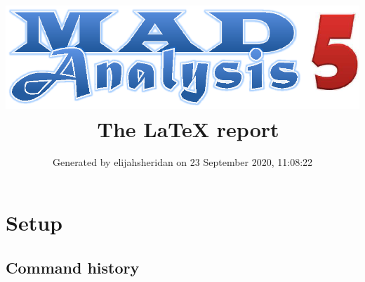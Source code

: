 \documentclass[a4paper, 10pt]{article}
\title{{\includegraphics[scale=.4]{logo.eps}}\ The LaTeX report}
\author{Generated by elijahsheridan on 23 September 2020, 11:08:22}
\begin{document}
\maketitle
\flushbottom

\newpage
\section{ Setup}

\subsection{ Command history}
\end{document}

